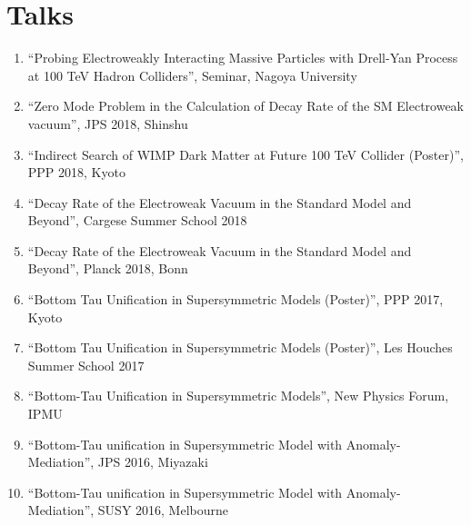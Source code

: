 \documentclass[12pt]{article}
\begin{document}
\vspace{-5mm}


\nocite{*}

\section*{Talks}

\begin{enumerate}
 \item ``Probing Electroweakly Interacting Massive Particles with Drell-Yan Process at 100 TeV Hadron Colliders'', Seminar, Nagoya University
 \item ``Zero Mode Problem in the Calculation of Decay Rate of the SM Electroweak vacuum'', JPS 2018, Shinshu
 \item ``Indirect Search of WIMP Dark Matter at Future 100 TeV Collider (Poster)'', PPP 2018, Kyoto
 \item ``Decay Rate of the Electroweak Vacuum in the Standard Model and Beyond'', Cargese Summer School 2018
 \item ``Decay Rate of the Electroweak Vacuum in the Standard Model and Beyond'', Planck 2018, Bonn
 \item ``Bottom Tau Unification in Supersymmetric Models (Poster)'', PPP 2017, Kyoto
 \item ``Bottom Tau Unification in Supersymmetric Models (Poster)'', Les Houches Summer School 2017
 \item ``Bottom-Tau Unification in Supersymmetric Models'', New Physics Forum, IPMU
 \item ``Bottom-Tau unification in Supersymmetric Model with Anomaly-Mediation'', JPS 2016, Miyazaki
 \item ``Bottom-Tau unification in Supersymmetric Model with Anomaly-Mediation'', SUSY 2016, Melbourne
\end{enumerate}
\end{document}
